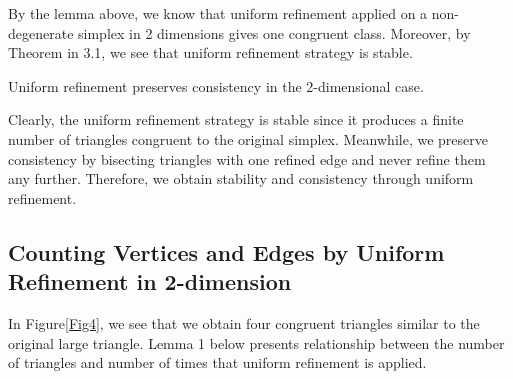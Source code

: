     By the lemma above, we know that uniform refinement applied on a non-degenerate simplex in 2 dimensions gives one congruent class. Moreover, by Theorem in 3.1, we see that uniform refinement strategy is stable.

    \begin{lemma*}
    Uniform refinement preserves consistency in the 2-dimensional case.
    \end{lemma*}


    Clearly, the uniform refinement strategy is stable since it produces a finite number of triangles congruent to the original simplex. Meanwhile, we preserve consistency by bisecting triangles with one refined edge and never refine them any further. Therefore, we obtain stability and consistency through uniform refinement.

    \subsection{Counting Vertices and Edges by Uniform Refinement in 2-dimension}
    In Figure\ref{Fig4}, we see that we obtain four congruent triangles similar to the original large triangle. Lemma 1 below presents relationship between the number of triangles and number of times that uniform refinement is applied.

